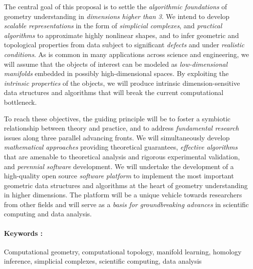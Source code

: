 The central goal of this proposal is to settle the {\em algorithmic
  foundations} of geometry understanding in {\em dimensions higher
  than 3}.  We intend to develop {\em scalable representations} in the
form of {\em simplicial complexes}, and {\em practical algorithms} to
approximate highly nonlinear shapes, and to infer geometric and
topological properties from data subject to significant {\em defects}
and under {\em realistic conditions}.  As is common in many
applications across science and engineering, we will assume that the
objects of interest can be modeled as {\em low-dimensional manifolds}
embedded in possibly high-dimensional spaces. By exploiting the {\em
  intrinsic properties} of the objects, we will produce intrinsic
dimension-sensitive data structures and algorithms that will break the
current computational bottleneck.

To reach these objectives, the guiding principle will be to foster a
symbiotic relationship between theory and practice, and to address
{\em fundamental research} issues along three parallel advancing
fronts. We will simultaneously develop {\em mathematical approaches}
providing theoretical guarantees, {\em effective algorithms} that are
amenable to theoretical analysis and rigorous experimental validation,
and {\em perennial software} development.  We will undertake the
development of a high-quality open source {\em software platform} to
implement the most important geometric data structures and algorithms
at the heart of geometry understanding in higher dimensions. The
platform will be a unique vehicle towards researchers from other
fields and will serve as a {\em basis for groundbreaking advances} in
scientific computing and data analysis.



\paragraph{Keywords :} Computational geometry, computational topology,
manifold learning, homology inference, simplicial complexes,
scientific computing, data analysis
